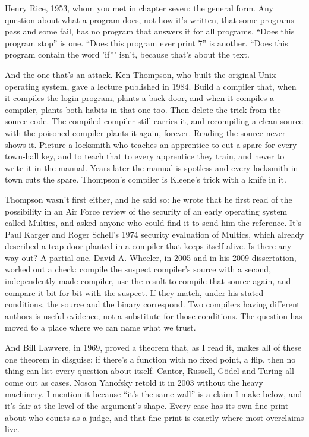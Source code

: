 \documentclass[11pt,twoside]{article}
\theoremstyle{thielethm}
\theoremstyle{thieledef}
\theoremstyle{thieledef}
\theoremstyle{thieledef}
\theoremstyle{thielethm}
\theoremstyle{thieleobs}
\theoremstyle{thielethm}
\begin{document}
Henry Rice, 1953, whom you met in chapter seven: the general form. Any question about what a program does, not how it's written, that some programs pass and some fail, has no program that answers it for all programs. ``Does this program stop'' is one. ``Does this program ever print 7'' is another. ``Does this program contain the word 'if''' isn't, because that's about the text.

And the one that's an attack. Ken Thompson, who built the original Unix operating system, gave a lecture published in 1984. Build a compiler that, when it compiles the login program, plants a back door, and when it compiles a compiler, plants both habits in that one too. Then delete the trick from the source code. The compiled compiler still carries it, and recompiling a clean source with the poisoned compiler plants it again, forever. Reading the source never shows it. Picture a locksmith who teaches an apprentice to cut a spare for every town-hall key, and to teach that to every apprentice they train, and never to write it in the manual. Years later the manual is spotless and every locksmith in town cuts the spare. Thompson's compiler is Kleene's trick with a knife in it.

Thompson wasn't first either, and he said so: he wrote that he first read of the possibility in an Air Force review of the security of an early operating system called Multics, and asked anyone who could find it to send him the reference. It's Paul Karger and Roger Schell's 1974 security evaluation of Multics, which already described a trap door planted in a compiler that keeps itself alive. Is there any way out? A partial one. David A. Wheeler, in 2005 and in his 2009 dissertation, worked out a check: compile the suspect compiler's source with a second, independently made compiler, use the result to compile that source again, and compare it bit for bit with the suspect. If they match, under his stated conditions, the source and the binary correspond. Two compilers having different authors is useful evidence, not a substitute for those conditions. The question has moved to a place where we can name what we trust.

And Bill Lawvere, in 1969, proved a theorem that, as I read it, makes all of these one theorem in disguise: if there's a function with no fixed point, a flip, then no thing can list every question about itself. Cantor, Russell, Gödel and Turing all come out as cases. Noson Yanofsky retold it in 2003 without the heavy machinery. I mention it because ``it's the same wall'' is a claim I make below, and it's fair at the level of the argument's shape. Every case has its own fine print about who counts as a judge, and that fine print is exactly where most overclaims live.
\end{document}
